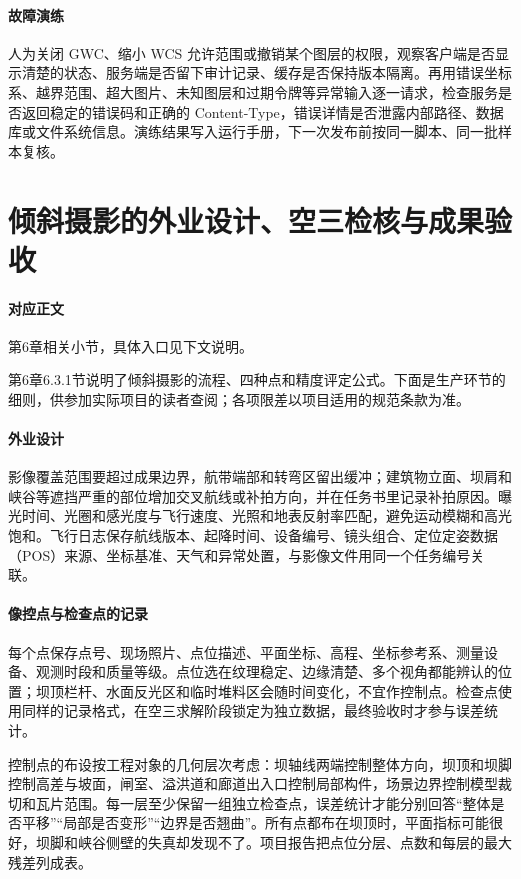 \paragraph{故障演练}人为关闭 GWC、缩小 WCS 允许范围或撤销某个图层的权限，观察客户端是否显示清楚的状态、服务端是否留下审计记录、缓存是否保持版本隔离。再用错误坐标系、越界范围、超大图片、未知图层和过期令牌等异常输入逐一请求，检查服务是否返回稳定的错误码和正确的 Content-Type，错误详情是否泄露内部路径、数据库或文件系统信息。演练结果写入运行手册，下一次发布前按同一脚本、同一批样本复核。



\section{倾斜摄影的外业设计、空三检核与成果验收}\label{app:ext-ch06-photogrammetry}

\paragraph{对应正文}第6章相关小节，具体入口见下文说明。

第6章6.3.1节说明了倾斜摄影的流程、四种点和精度评定公式。下面是生产环节的细则，供参加实际项目的读者查阅；各项限差以项目适用的规范条款为准。

\paragraph{外业设计}影像覆盖范围要超过成果边界，航带端部和转弯区留出缓冲；建筑物立面、坝肩和峡谷等遮挡严重的部位增加交叉航线或补拍方向，并在任务书里记录补拍原因。曝光时间、光圈和感光度与飞行速度、光照和地表反射率匹配，避免运动模糊和高光饱和。飞行日志保存航线版本、起降时间、设备编号、镜头组合、定位定姿数据（POS）来源、坐标基准、天气和异常处置，与影像文件用同一个任务编号关联。

\paragraph{像控点与检查点的记录}每个点保存点号、现场照片、点位描述、平面坐标、高程、坐标参考系、测量设备、观测时段和质量等级。点位选在纹理稳定、边缘清楚、多个视角都能辨认的位置；坝顶栏杆、水面反光区和临时堆料区会随时间变化，不宜作控制点。检查点使用同样的记录格式，在空三求解阶段锁定为独立数据，最终验收时才参与误差统计。

控制点的布设按工程对象的几何层次考虑：坝轴线两端控制整体方向，坝顶和坝脚控制高差与坡面，闸室、溢洪道和廊道出入口控制局部构件，场景边界控制模型裁切和瓦片范围。每一层至少保留一组独立检查点，误差统计才能分别回答“整体是否平移”“局部是否变形”“边界是否翘曲”。所有点都布在坝顶时，平面指标可能很好，坝脚和峡谷侧壁的失真却发现不了。项目报告把点位分层、点数和每层的最大残差列成表。

